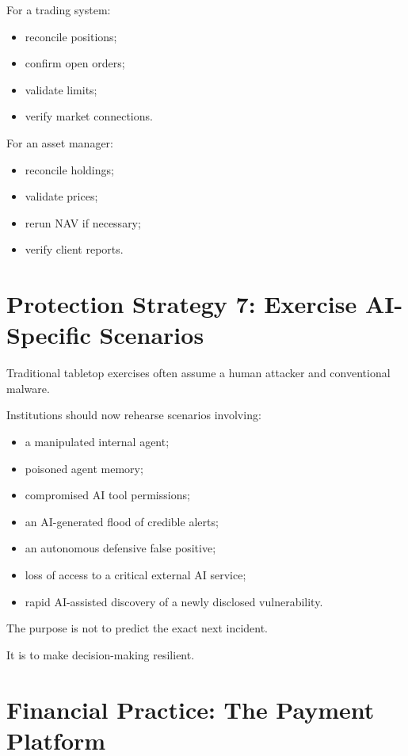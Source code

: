 For a trading system:

\begin{itemize}
    \item reconcile positions;
    \item confirm open orders;
    \item validate limits;
    \item verify market connections.
\end{itemize}

For an asset manager:

\begin{itemize}
    \item reconcile holdings;
    \item validate prices;
    \item rerun NAV if necessary;
    \item verify client reports.
\end{itemize}

\section{Protection Strategy 7: Exercise AI-Specific Scenarios}

Traditional tabletop exercises often assume a human attacker and conventional malware.

Institutions should now rehearse scenarios involving:

\begin{itemize}
    \item a manipulated internal agent;
    \item poisoned agent memory;
    \item compromised AI tool permissions;
    \item an AI-generated flood of credible alerts;
    \item an autonomous defensive false positive;
    \item loss of access to a critical external AI service;
    \item rapid AI-assisted discovery of a newly disclosed vulnerability.
\end{itemize}

The purpose is not to predict the exact next incident.

It is to make decision-making resilient.

\section{Financial Practice: The Payment Platform}

